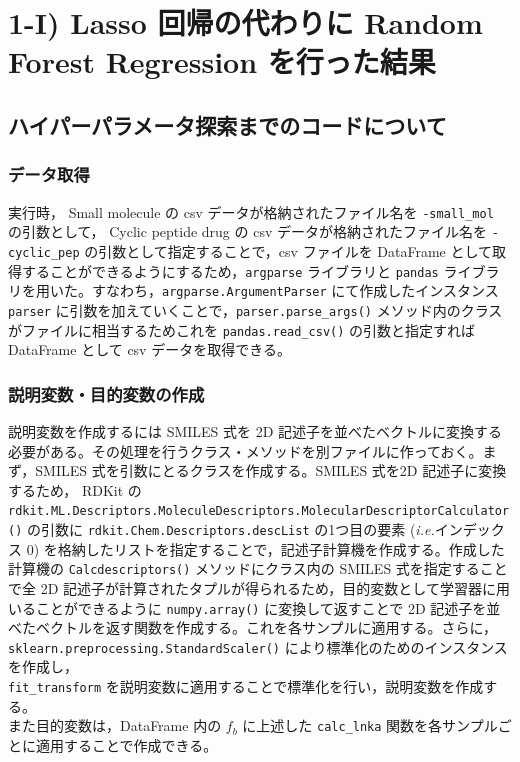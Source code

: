 \documentclass[a4j,11pt]{jarticle}
\begin{document}
\section{1-I)  Lasso 回帰の代わりに Random Forest Regression を行った結果}

\subsection{ハイパーパラメータ探索までのコードについて}
\subsubsection{データ取得}
実行時， Small molecule の csv データが格納されたファイル名を \texttt{-small\_mol} の引数として， Cyclic peptide drug の csv データが格納されたファイル名を \texttt{-cyclic\_pep} の引数として指定することで，csv ファイルを DataFrame として取得することができるようにするため，\texttt{argparse} ライブラリと \texttt{pandas} ライブラリを用いた。すなわち，\texttt{argparse.ArgumentParser} にて作成したインスタンス \texttt{parser} に引数を加えていくことで，\texttt{parser.parse\_args()} メソッド内のクラスがファイルに相当するためこれを \texttt{pandas.read\_csv()} の引数と指定すれば DataFrame として csv データを取得できる。

\subsubsection{説明変数・目的変数の作成}
説明変数を作成するには SMILES 式を 2D 記述子を並べたベクトルに変換する必要がある。その処理を行うクラス・メソッドを別ファイルに作っておく。まず，SMILES 式を引数にとるクラスを作成する。SMILES 式を2D 記述子に変換するため， RDKit の \\\texttt{rdkit.ML.Descriptors.MoleculeDescriptors.MolecularDescriptorCalculator()} の引数に \texttt{rdkit.Chem.Descriptors.descList} の1つ目の要素 (\textit{i.e.}インデックス 0) を格納したリストを指定することで，記述子計算機を作成する。作成した計算機の \texttt{Calcdescriptors()} メソッドにクラス内の SMILES 式を指定することで全 2D 記述子が計算されたタプルが得られるため，目的変数として学習器に用いることができるように \texttt{numpy.array()} に変換して返すことで 2D 記述子を並べたベクトルを返す関数を作成する。これを各サンプルに適用する。さらに，\\\texttt{sklearn.preprocessing.StandardScaler()} により標準化のためのインスタンスを作成し，\\\texttt{fit\_transform} を説明変数に適用することで標準化を行い，説明変数を作成する。\\
また目的変数は，DataFrame 内の $f_b$ に上述した \texttt{calc\_lnka} 関数を各サンプルごとに適用することで作成できる。
\end{document}
